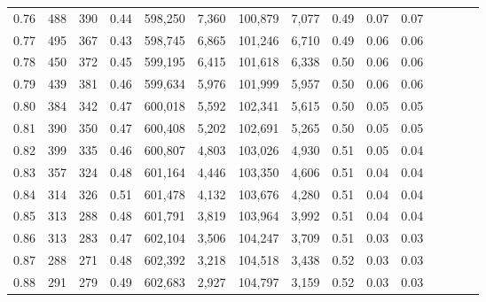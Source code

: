 \begin{tabular}{rrrcrrrrrrrrrrr}
0.76 &     488 &    390 &                                       0.44 &  598,250 &    7,360 &  100,879 &    7,077 &  0.49 &  0.07 &                         0.07 \\
0.77 &     495 &    367 &                                       0.43 &  598,745 &    6,865 &  101,246 &    6,710 &  0.49 &  0.06 &                         0.06 \\
0.78 &     450 &    372 &                                       0.45 &  599,195 &    6,415 &  101,618 &    6,338 &  0.50 &  0.06 &                         0.06 \\
0.79 &     439 &    381 &                                       0.46 &  599,634 &    5,976 &  101,999 &    5,957 &  0.50 &  0.06 &                         0.06 \\
0.80 &     384 &    342 &                                       0.47 &  600,018 &    5,592 &  102,341 &    5,615 &  0.50 &  0.05 &                         0.05 \\
0.81 &     390 &    350 &                                       0.47 &  600,408 &    5,202 &  102,691 &    5,265 &  0.50 &  0.05 &                         0.05 \\
0.82 &     399 &    335 &                                       0.46 &  600,807 &    4,803 &  103,026 &    4,930 &  0.51 &  0.05 &                         0.04 \\
0.83 &     357 &    324 &                                       0.48 &  601,164 &    4,446 &  103,350 &    4,606 &  0.51 &  0.04 &                         0.04 \\
0.84 &     314 &    326 &                                       0.51 &  601,478 &    4,132 &  103,676 &    4,280 &  0.51 &  0.04 &                         0.04 \\
0.85 &     313 &    288 &                                       0.48 &  601,791 &    3,819 &  103,964 &    3,992 &  0.51 &  0.04 &                         0.04 \\
0.86 &     313 &    283 &                                       0.47 &  602,104 &    3,506 &  104,247 &    3,709 &  0.51 &  0.03 &                         0.03 \\
0.87 &     288 &    271 &                                       0.48 &  602,392 &    3,218 &  104,518 &    3,438 &  0.52 &  0.03 &                         0.03 \\
0.88 &     291 &    279 &                                       0.49 &  602,683 &    2,927 &  104,797 &    3,159 &  0.52 &  0.03 &                         0.03 \\

\end{tabular}
